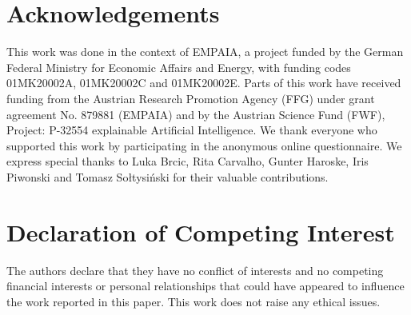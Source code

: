 \section*{Acknowledgements}

This work was done in the context of EMPAIA, a project funded by the German Federal Ministry for Economic Affairs and Energy, with funding codes 01MK20002A, 01MK20002C and 01MK20002E. Parts of this work have received funding from the Austrian Research Promotion Agency (FFG) under grant agreement No. 879881 (EMPAIA) and by the Austrian Science Fund (FWF), Project: P-32554 explainable Artificial Intelligence. We thank everyone who supported this work by participating in the anonymous online questionnaire. We express special thanks to Luka Brcic, Rita Carvalho, Gunter Haroske, Iris Piwonski and Tomasz Sołtysiński for their valuable contributions. 

\section*{Declaration of Competing Interest}

The authors declare that they have no conflict of interests and no competing financial interests or personal relationships that could have appeared to influence the work reported in this paper. This work does not raise any ethical issues.


